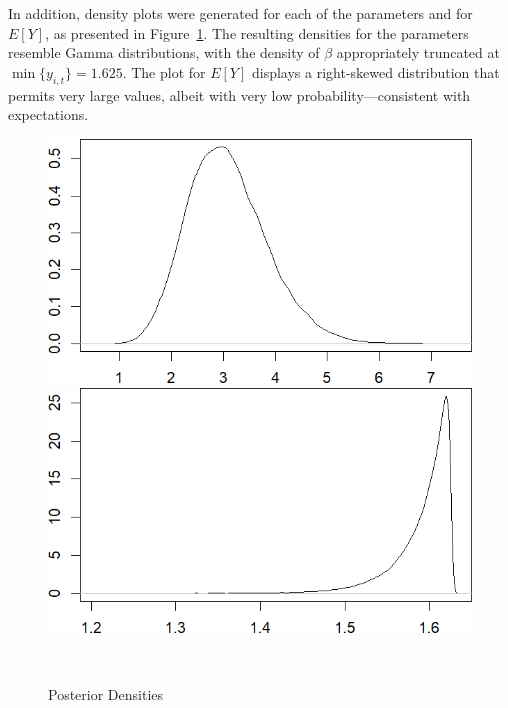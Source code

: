 \documentclass{Class/julia}
\begin{document}
In addition, density plots were generated for each of the parameters and for \( E[Y] \), as presented in Figure~\ref{fig:1}. The resulting densities for the parameters resemble Gamma distributions, with the density of \( \beta \) appropriately truncated at \( \min\{y_{i,t}\} = 1.625 \). The plot for \( E[Y] \) displays a right-skewed distribution that permits very large values, albeit with very low probability---consistent with expectations.

\begin{figure}[!ht]
    \centering
    \caption{Posterior Densities}
    \label{fig:1}
    \begin{minipage}{0.45\textwidth}
        \centering
        \includegraphics[width=\textwidth]{rytgaard1990/density_alpha.png}
        \subcaption{\( \alpha \)}
    \end{minipage}%
    \hfill
    \begin{minipage}{0.45\textwidth}
        \centering
        \includegraphics[width=\textwidth]{rytgaard1990/density_beta.png}
        \subcaption{\( \beta \)}
    \end{minipage} \\
    

\end{figure}
\end{document}
